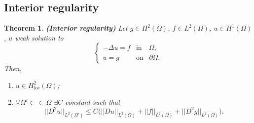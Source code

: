 \documentclass[12pt]{article}
\newtheorem{theorem}{Theorem}[section]
\theoremstyle{definition}
\begin{document}
\subsection{Interior regularity}
\begin{theorem}\label{interior_regularity}
\emph{\textbf{(Interior regularity)}} Let $g\in H^2(\Omega)$, $f\in L^2(\Omega)$, $u\in H^1(\Omega)$, $u$ weak solution to
\[\left\{\begin{array}{rcl}-\Delta u=f&\text{in}&\Omega,\\u=g&\text{on}&\partial\Omega.\end{array}\right.\]
Then,
\begin{enumerate}[label=(\roman*)]
\item $u\in H_{\text{loc}}^2(\Omega)$;
\item $\forall\Omega'\subset\subset\Omega$ $\exists C$ constant such that
\[||D^2u||_{L^2(\Omega')}\leq C\big(||Du||_{L^2(\Omega)}+||f||_{L^2(\Omega)}+||D^2g||_{L^2(\Omega)}\big).\]
\end{enumerate}
\end{theorem}
\end{document}
